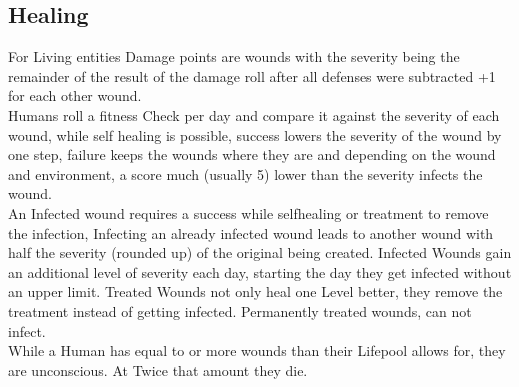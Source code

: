 \subsection{Healing}
For Living entities Damage points are wounds with the severity being the remainder of the result of the damage roll
after all defenses were subtracted +1 for each other wound.\\
Humans roll a fitness Check per day and compare it against the severity of each wound, while self healing is
possible, success lowers the severity of the wound by one step, failure keeps the wounds where they are and
depending on the wound and environment, a score much (usually 5) lower than the severity infects the wound.\\
An Infected wound requires a success while selfhealing or treatment to remove the infection, Infecting an already
infected wound leads to another wound with half the severity (rounded up) of the original being created.
Infected
Wounds gain an additional level of  severity each day, starting the day they get infected without an upper limit.
Treated Wounds not only heal one Level better, they remove the treatment instead of getting infected.
Permanently
treated wounds, can not infect. \\
While a Human has equal to or more wounds than their Lifepool allows for, they are unconscious.
At Twice that amount
they die.
